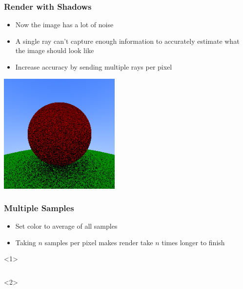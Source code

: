 \documentclass{beamer}
\begin{document}
\begin{frame}
	\frametitle{Render with Shadows}
	\begin{itemize}
		\item Now the image has a lot of noise
		\item A single ray can't capture enough information to accurately estimate what the image should look like
		\item Increase accuracy by sending multiple rays per pixel
	\end{itemize}
	\begin{center}
		\includegraphics[width=0.45\textwidth]{media/shading.png}
	\end{center}
\end{frame}

\begin{frame}[fragile]
	\frametitle{Multiple Samples}
	\begin{itemize}
		\item Set color to average of all samples
		\item Taking $n$ samples per pixel makes render take $n$ times longer to finish
	\end{itemize}
	\begin{onlyenv}
		\inputminted{python}{scripts/samples.py}
	\end{onlyenv}
\end{frame}
\end{document}
